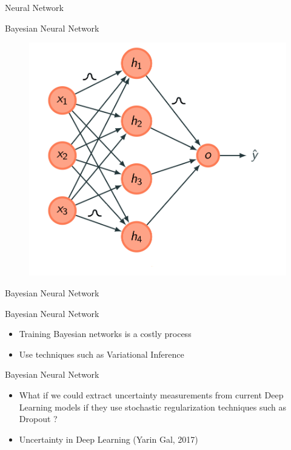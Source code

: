 \documentclass[10pt]{beamer}
\begin{document}
\begin{frame}[fragile]{Neural Network}
    
\end{frame}

\begin{frame}[fragile]{Bayesian Neural Network}
    \begin{figure}[htp]
        \centering
        \includegraphics[scale=0.3]{images/bayesian_neural_network.png}
    \end{figure}
\end{frame}

\begin{frame}[fragile]{Bayesian Neural Network}
    
\end{frame}

\begin{frame}[fragile]{Bayesian Neural Network}
\begin{itemize}
\item Training Bayesian networks is a costly process
\vspace{0.5cm}
\item Use techniques such as Variational Inference
\end{itemize}
\end{frame}

\begin{frame}[fragile]{Bayesian Neural Network}
\begin{itemize}
\item What if we could extract uncertainty measurements from current Deep
    Learning models if they use stochastic regularization techniques such as
    \alert{Dropout} ?
\vspace{0.5cm}
\item Uncertainty in Deep Learning (Yarin Gal, 2017)
\end{itemize}
\end{frame}
\end{document}
